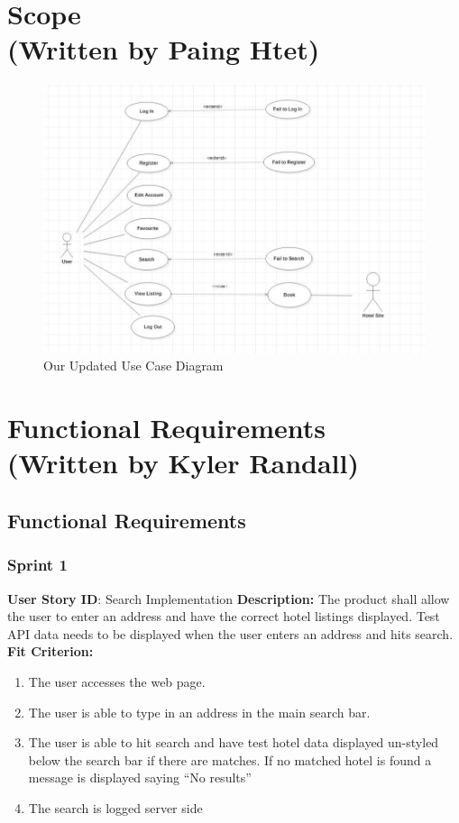 \documentclass[]{article}
\begin{document}
\section{Scope \\(Written by Paing Htet)}
\begin{figure}[H]
    \centering
    \includegraphics[scale=0.4]{usecase.png}
    \caption{Our Updated Use Case Diagram}
\end{figure}

\section{Functional Requirements \\ (Written by Kyler Randall)}
\subsection{Functional Requirements}
\subsubsection{Sprint 1}
\textbf{User Story ID}: Search Implementation\newline
\textbf{Description:} The product shall allow the user to enter an address and have the correct hotel listings displayed. Test API data needs to be displayed when the user enters an address and hits search. \newline
\textbf{Fit Criterion:}
\begin{enumerate}
    \item The user accesses the web page.
    \item The user is able to type in an address in the main search bar.
    \item The user is able to hit search and have test hotel data displayed un-styled below the search bar if there are matches. If no matched hotel is found a message is displayed saying “No results”
    \item The search is logged server side
\end{enumerate}
\end{document}

